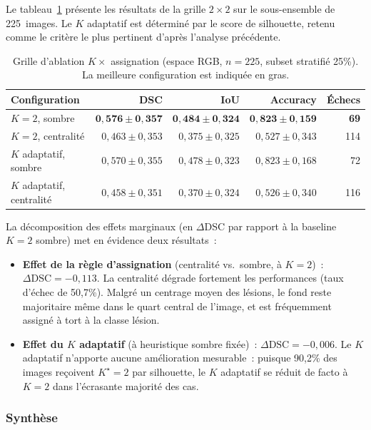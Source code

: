 \documentclass[12pt,a4paper]{article}
\begin{document}
Le tableau~\ref{tab:k_grid} présente les résultats de la grille $2 \times 2$ sur le sous-ensemble de 225~images. Le $K$ adaptatif est déterminé par le score de silhouette, retenu comme le critère le plus pertinent d'après l'analyse précédente.

\begin{table}[H]
\centering
\caption{Grille d'ablation $K \times$ assignation (espace RGB, $n = 225$, subset stratifié 25\%). La meilleure configuration est indiquée en gras.}
\label{tab:k_grid}
\begin{tabular}{l r r r r}
\toprule
\textbf{Configuration} & \textbf{DSC} & \textbf{IoU} & \textbf{Accuracy} & \textbf{Échecs} \\
\midrule
$K = 2$, sombre            & $\mathbf{0{,}576 \pm 0{,}357}$ & $\mathbf{0{,}484 \pm 0{,}324}$ & $\mathbf{0{,}823 \pm 0{,}159}$ & \textbf{69} \\
$K = 2$, centralité        & $0{,}463 \pm 0{,}353$ & $0{,}375 \pm 0{,}325$ & $0{,}527 \pm 0{,}343$ & 114 \\
$K$ adaptatif, sombre       & $0{,}570 \pm 0{,}355$ & $0{,}478 \pm 0{,}323$ & $0{,}823 \pm 0{,}168$ & 72 \\
$K$ adaptatif, centralité   & $0{,}458 \pm 0{,}351$ & $0{,}370 \pm 0{,}324$ & $0{,}526 \pm 0{,}340$ & 116 \\
\bottomrule
\end{tabular}
\end{table}

La décomposition des effets marginaux (en $\Delta$DSC par rapport à la baseline $K = 2$ sombre) met en évidence deux résultats~:
\begin{itemize}[nosep]
    \item \textbf{Effet de la règle d'assignation} (centralité vs.\ sombre, à $K = 2$)~: $\Delta\text{DSC} = -0{,}113$. La centralité dégrade fortement les performances (taux d'échec de 50{,}7\%). Malgré un centrage moyen des lésions, le fond reste majoritaire même dans le quart central de l'image, et est fréquemment assigné à tort à la classe lésion.
    \item \textbf{Effet du $K$ adaptatif} (à heuristique sombre fixée)~: $\Delta\text{DSC} = -0{,}006$. Le $K$ adaptatif n'apporte aucune amélioration mesurable~: puisque 90{,}2\% des images reçoivent $K^\star = 2$ par silhouette, le $K$ adaptatif se réduit de facto à $K = 2$ dans l'écrasante majorité des cas.
\end{itemize}

\subsubsection{Synthèse}
\label{subsubsec:discussion_kmeans}
\end{document}
